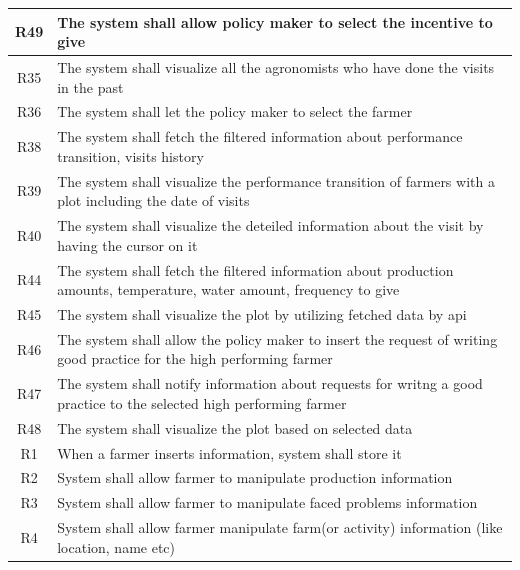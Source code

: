 \begin{center}
\begin{longtable}{|c|m{}|}
            \hline
            \textsc{R49}  &    The system shall allow policy maker to select the incentive to give \\
            \hline
            \textsc{R35}  &    The system shall visualize all the agronomists who have done the visits in the past \\
            \hline
            \textsc{R36}  &    The system shall let the policy maker to select the farmer  \\
            \hline
            \textsc{R38}  &    The system shall fetch the filtered information about performance transition, visits history  \\
            \hline
            \textsc{R39}  &    The system shall visualize the performance transition of farmers with a plot including the date of visits  \\
            \hline
            \textsc{R40}  &    The system shall visualize the deteiled information about the visit by having  the cursor on it  \\
            \hline
            \textsc{R44}  &    The system shall fetch the filtered information about production amounts, temperature, water amount, frequency to give  \\
            \hline
            \textsc{R45}  &    The system shall visualize the plot by utilizing fetched data by api  \\
            \hline
            \textsc{R46}  &    The system shall allow the policy maker to insert the request of writing good practice for the high performing farmer  \\
            \hline
            \textsc{R47}  &    The system shall notify information about requests for writng a good practice to the selected high performing farmer  \\
            \hline
            \textsc{R48}  &    The system shall visualize the plot based on selected data  \\
            \hline
            \hline
            \hline
            \textsc{R1}  &    When a farmer inserts information, system shall store it  \\
            \hline
            \textsc{R2}  &    System shall allow farmer to manipulate production information  \\
            \hline
            \textsc{R3}  &    System shall allow farmer to manipulate faced problems information  \\
            \hline
            \textsc{R4}  &    System shall allow farmer manipulate farm(or activity) information (like location, name etc)  \\

\end{longtable}
\end{center}
